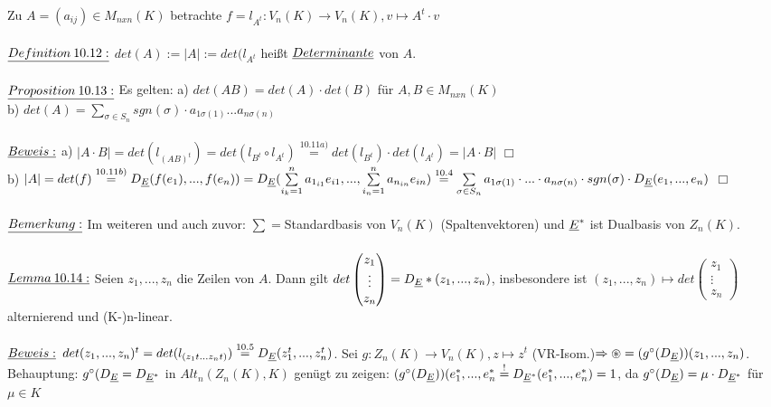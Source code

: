 \documentclass[fleqn, a4paper, 11pt]{article}
\begin{document}
Zu $A=(a_{ij})\in M_{nxn}(K)$ betrachte $f=l_{A^t}:V_n(K)\rightarrow V_n(K),v\mapsto A^t\cdot v$\\
\\
$\uline{Definition\:10.12:}$ $det(A):=|A|:=det(l_{A^t}$ hei\ss{}t $\uline{Determinante}$ von $A$.\\
\\
$\uline{Proposition\:10.13:}$ Es gelten: a) $det(AB)=det(A)\cdot det(B)$ f\"ur $A,B\in M_{nxn}(K)$\\
b) $det(A)=\sum\limits_{\sigma\in S_n} sgn(\sigma)\cdot a_{1\sigma(1)}...a_{n\sigma(n)}$\\
\\
$\uline{Beweis:}$ a) $|A\cdot B|=det(l_{(AB)^t})=det(l_{B^t}\circ l_{A^t})\stackrel{10.11a)}{=}det(l_{B^t})\cdot det(l_{A^t})=|A\cdot B|$ \hfill $\Box$\\
b) $|A|=det(f)\stackrel{10.11b)}{=}D_{\uline{E}}(f(e_1),...,f(e_n))=D_{\uline{E}}(\sum\limits_{i_k =1}^n a_{1_{i1}}e_{i1},...,\sum\limits_{i_n  =1}^n a_{n_{in}}e_{in})\stackrel{10.4}{=}\sum\limits_{\sigma\in S_n} a_{1\sigma(1)}\cdot ...\cdot a_{n\sigma(n)}\cdot sgn(\sigma)\cdot D_{\uline{E}}(e_1,...,e_n)$ \hfill $\Box$\\
\\
$\uline{Bemerkung:}$ Im weiteren und auch zuvor: $\sum =$Standardbasis von $V_n(K)$ (Spaltenvektoren) und $\uline{E}^{\ast}$ ist Dualbasis von $Z_n(K)$.\\
\\
$\uline{Lemma\:10.14:}$ Seien $z_1,...,z_n$ die Zeilen von $A$. Dann gilt $det\begin{pmatrix}
	z_1\\
	\vdots\\
	z_n
\end{pmatrix}=D_{\uline{E}}\ast(z_1,...,z_n)$, insbesondere ist $(z_1,...,z_n)\mapsto det\begin{pmatrix}
	z_1\\
	\vdots\\
	z_n
\end{pmatrix}$ alternierend und (K-)n-linear.\\
\\
$\uline{Beweis:}$ $det(z_1,...,z_n)^t=det(l_{(z_1 t...z_n t)})\stackrel{10.5}{=}D_{\uline{E}}(z_1 ^t,...,z_n ^t)$. Sei $g:Z_n(K)\rightarrow V_n(K),z\mapsto z^t$ (VR-Isom.)$\Rightarrow \circledast=(g^{\circ}(D_{\uline{E}}))(z_1,...,z_n)$. Behauptung: $g^{\circ}(D_{\uline{E}}=D_{\uline{E}^{\ast}}$ in $Alt_n(Z_n(K),K)$ gen\"ugt zu zeigen: $(g^{\circ}(D_{\uline{E}}))(e_1^{\ast},...,e_n^{\ast}\stackrel{!}{=}D_{\uline{E}^{\ast}}(e_1^{\ast},...,e_n^{\ast})=1$, da $g^{\circ}(D_{\uline{E}})=\mu\cdot D_{\uline{E}^{\ast}}$ f\"ur $\mu\in K$\\
\end{document}
